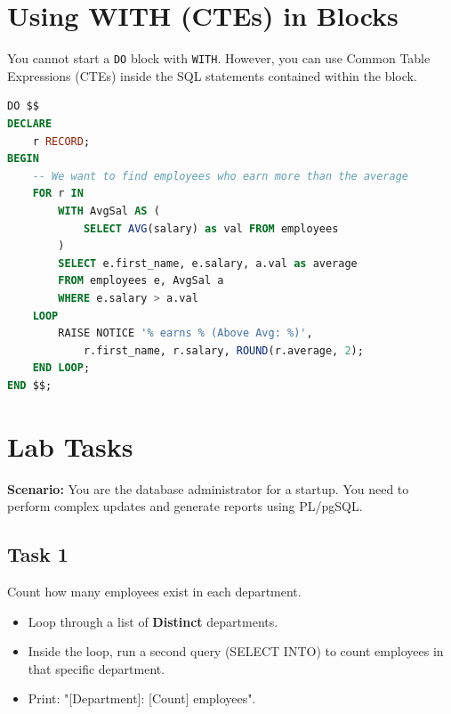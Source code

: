 \documentclass[12pt,a4paper]{article}
\newif\ifshowsolutions
\begin{document}
\newpage
\section{Using WITH (CTEs) in Blocks}

You cannot start a \texttt{DO} block with \texttt{WITH}. However, you can use Common Table Expressions (CTEs) inside the SQL statements contained within the block.

\begin{lstlisting}[language=SQL, caption={CTE inside Anonymous Block}]
DO $$ 
DECLARE
    r RECORD;
BEGIN
    -- We want to find employees who earn more than the average
    FOR r IN 
        WITH AvgSal AS (
            SELECT AVG(salary) as val FROM employees
        )
        SELECT e.first_name, e.salary, a.val as average
        FROM employees e, AvgSal a
        WHERE e.salary > a.val
    LOOP
        RAISE NOTICE '% earns % (Above Avg: %)', 
            r.first_name, r.salary, ROUND(r.average, 2);
    END LOOP;
END $$;
\end{lstlisting}

\newpage
\section{Lab Tasks}

\textbf{Scenario:} You are the database administrator for a startup. You need to perform complex updates and generate reports using PL/pgSQL.


\subsection*{Task 1}
Count how many employees exist in each department.
\begin{itemize}
    \item Loop through a list of \textbf{Distinct} departments.
    \item Inside the loop, run a second query (SELECT INTO) to count employees in that specific department.
    \item Print: "[Department]: [Count] employees".
\end{itemize}

\ifshowsolutions
\textbf{Solution:}
\begin{lstlisting}[language=SQL]
DO $$ 
DECLARE
    r RECORD;
    v_count INT;
BEGIN
    -- Loop through unique department names
    FOR r IN SELECT DISTINCT department FROM employees LOOP
        
        -- Run a query for this specific department
        SELECT COUNT(*) INTO v_count 
        FROM employees 
        WHERE department = r.department;

        RAISE NOTICE '%: % employees', r.department, v_count;
    END LOOP;
END $$;
\end{lstlisting}
\fi
\end{document}
